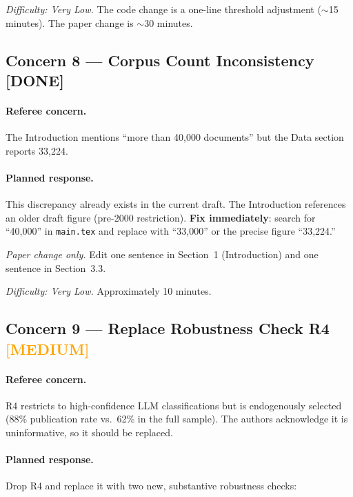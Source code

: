 \documentclass[12pt]{article}
\newcommand{\MED}{\textcolor{orange}{\textbf{[MEDIUM]}}}
\newcommand{\DONE}{\textcolor{green!60!black}{\textbf{[DONE]}}}
\begin{document}
\textit{Difficulty: Very Low.}  The code change is a one-line threshold
adjustment ($\sim$15 minutes).  The paper change is $\sim$30 minutes.

\subsection{Concern 8 --- Corpus Count Inconsistency \DONE}

\paragraph{Referee concern.}
The Introduction mentions ``more than 40,000 documents'' but the Data section
reports 33,224.

\paragraph{Planned response.}
This discrepancy already exists in the current draft.  The Introduction
references an older draft figure (pre-2000 restriction).  \textbf{Fix
immediately}: search for ``40,000'' in \texttt{main.tex} and replace with
``33,000'' or the precise figure ``33,224.''

\textit{Paper change only.}  Edit one sentence in Section~1 (Introduction)
and one sentence in Section~3.3.

\textit{Difficulty: Very Low.}  Approximately 10 minutes.

\subsection{Concern 9 --- Replace Robustness Check R4 \MED}

\paragraph{Referee concern.}
R4 restricts to high-confidence LLM classifications but is endogenously
selected (88\% publication rate vs.\ 62\% in the full sample).  The authors
acknowledge it is uninformative, so it should be replaced.

\paragraph{Planned response.}
Drop R4 and replace it with two new, substantive robustness checks:
\end{document}
